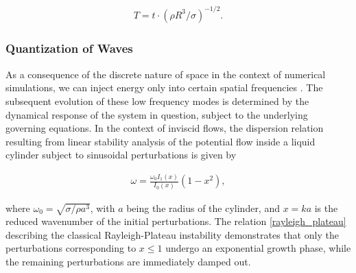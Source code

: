 \begin{align}
	T = t \cdot \left(\rho R^3 / \sigma \right)^{-1/2} . 
\end{align}


\subsubsection*{Quantization of Waves}

As a consequence of the discrete nature of space in
the context of numerical simulations, we can inject energy
only into certain spatial frequencies . 
The subsequent evolution of these low frequency modes  
is determined by the dynamical response of the system in question, 
subject to the underlying governing equations. 
In the context of inviscid flows, the dispersion relation
resulting from linear stability analysis of the potential flow
inside a liquid cylinder subject to sinusoidal perturbations is given by

\begin{align}
\omega = \frac{\omega_0 I_1(x)}{I_0(x)} \left(1 - x^2 \right) , 
\label{rayleigh_plateau}
\end{align}
 

where $\omega_0 = \sqrt{\sigma/ \rho a^3}$, with $a$ being the radius 
of the cylinder, and $x= ka$ is the reduced wavenumber of the initial perturbations. 
The relation \eqref{rayleigh_plateau} describing the classical 
Rayleigh-Plateau instability \cite{rayleigh1879a, plateau1849} 
demonstrates that only the perturbations corresponding to $x \leq 1 $ 
undergo an exponential growth phase, while the remaining perturbations 
are immediately damped out. 

